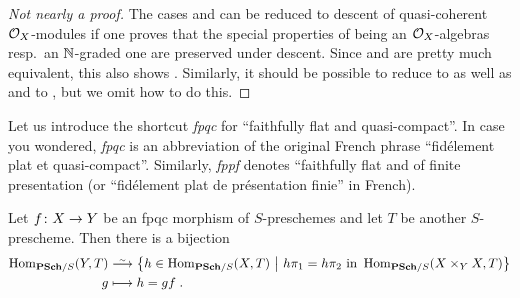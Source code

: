 \documentclass[a4paper,parskip=half,numbers=enddot, DIV=12]{scrreprt}
\begin{document}
\begin{proof}[Not nearly a proof]
	The cases  and  can be reduced to descent of quasi-coherent $\mathcal{O}_X$-modules if one proves that the special properties of being an $\mathcal{O}_X$-algebras resp.\ an $\mathbb{N}$-graded one are preserved under descent. Since  and  are pretty much equivalent, this also shows . Similarly, it should be possible to reduce  to  as well as  and  to , but we omit how to do this.
\end{proof}
Let us introduce the shortcut \emph{fpqc} for ``faithfully flat and quasi-compact''. In case you wondered, \emph{fpqc} is an abbreviation of the original French phrase ``fidélement plat et quasi-compact''. Similarly, \emph{fppf} denotes ``faithfully flat and of finite presentation (or ``fidélement plat de présentation finie'' in French).
\begin{cor}
	Let $f\colon X\morphism Y$ be an fpqc morphism of $S$-preschemes and let $T$ be another $S$-prescheme. Then there is a bijection
	\begin{align*}
		\Hom_{\cat{PSch}/S}(Y,T)&\isomorphism \left\{h\in\Hom_{\cat{PSch}/S}(X,T)\st h\pi_1=h\pi_2\text{ in }\Hom_{\cat{PSch}/S}(X\times_YX,T)\right\}\\
		g&\longmapsto h=gf\;.
	\end{align*}
\end{cor}
\end{document}
